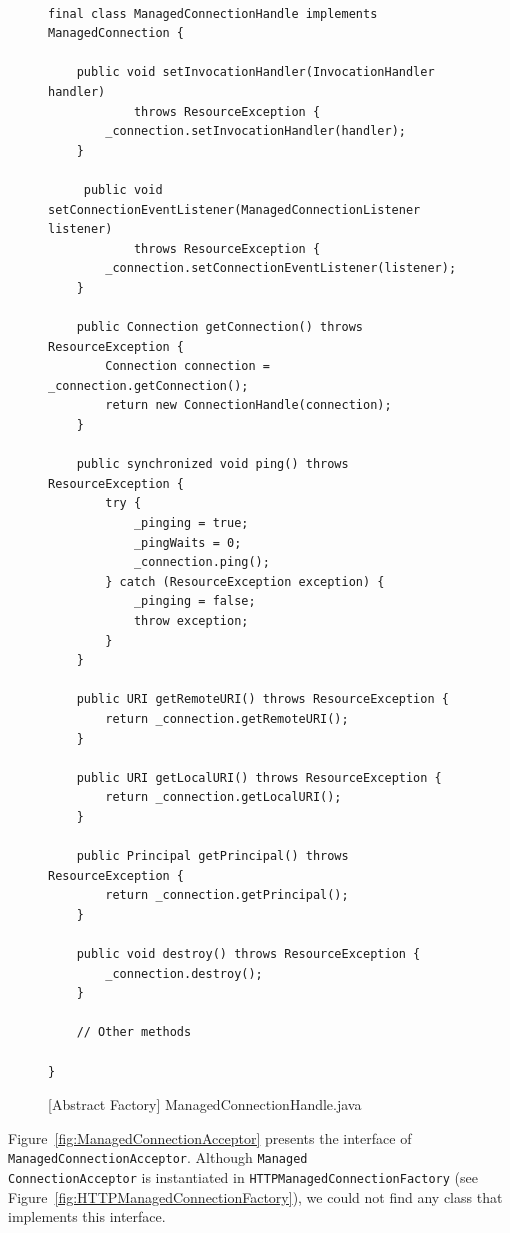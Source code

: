 \begin{figure}[htb]
\centering
\lstset{language=Java, basicstyle=\scriptsize, stepnumber=1, showspaces=false, showstringspaces=false,breaklines=true}
\begin{lstlisting}

final class ManagedConnectionHandle implements ManagedConnection {

    public void setInvocationHandler(InvocationHandler handler)
            throws ResourceException {
        _connection.setInvocationHandler(handler);
    }

     public void setConnectionEventListener(ManagedConnectionListener listener)
            throws ResourceException {
        _connection.setConnectionEventListener(listener);
    }

    public Connection getConnection() throws ResourceException {
        Connection connection = _connection.getConnection();
        return new ConnectionHandle(connection);
    }
    
    public synchronized void ping() throws ResourceException {
        try {
            _pinging = true;
            _pingWaits = 0;
            _connection.ping();
        } catch (ResourceException exception) {
            _pinging = false;
            throw exception;
        }
    }
    
    public URI getRemoteURI() throws ResourceException {
        return _connection.getRemoteURI();
    }
    
    public URI getLocalURI() throws ResourceException {
        return _connection.getLocalURI();
    }
    
    public Principal getPrincipal() throws ResourceException {
        return _connection.getPrincipal();
    }
    
    public void destroy() throws ResourceException {
        _connection.destroy();
    }
    
    // Other methods

}

\end{lstlisting}
\caption{[Abstract Factory] ManagedConnectionHandle.java}
\label{fig:ManagedConnectionHandle}
\end{figure}
\FloatBarrier


Figure~\ref{fig:ManagedConnectionAcceptor} presents the interface of \texttt{ManagedConnectionAcceptor}. 
Although \texttt{Managed\\ConnectionAcceptor} is instantiated in \texttt{HTTPManagedConnectionFactory} (see Figure~\ref{fig:HTTPManagedConnectionFactory}), we could not find any class that implements this interface.


